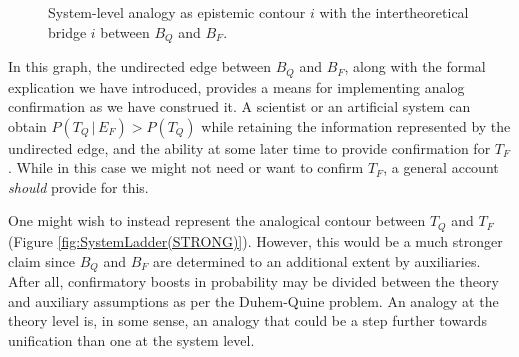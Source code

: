 \documentclass[11pt, oneside]{article}   	%
\begin{document}
\begin{figure} [ht!]
\begin{center}
\caption{System-level analogy as epistemic contour $i$ with the intertheoretical bridge $i$ between $B_Q$ and $B_F$.}
\label{fig:SystemLadder}
\end{center}
\end{figure}












In this graph, the undirected edge between $B_Q$ and $B_F$, along with the formal explication we have introduced, provides a means for implementing analog confirmation as we have construed it.  A scientist or an artificial system can obtain $P(T_Q\,|\,E_F)>P(T_Q)$ while retaining the information represented by the undirected edge, and the ability at some later time to provide confirmation for $T_F$.  While in this case we might not need or want to confirm $T_F$, a general account \emph{should} provide for this.

One might wish to instead represent the analogical contour between $T_Q$ and $T_F$ (Figure \ref{fig:SystemLadder(STRONG)}).  However, this would be a much stronger claim since $B_Q$ and $B_F$ are determined to an additional extent by auxiliaries.  After all, confirmatory boosts in probability may be divided between the theory and auxiliary assumptions as per the Duhem-Quine problem.  An analogy at the theory level is, in some sense, an analogy that could be a step further towards unification than one at the system level.  
\end{document}
